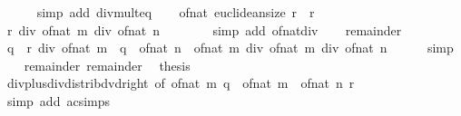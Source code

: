 \begin{isabellebody}
\ \ \ \ \isamarkupfalse%
\ {\isacharparenleft}{\kern0pt}simp\ add{\isacharcolon}{\kern0pt}\ div{\isacharunderscore}{\kern0pt}mult{}{\isacharunderscore}{\kern0pt}eq{\isacharparenright}{\kern0pt}\isanewline
\ \ \isamarkupfalse%
\ {\isacartoucheopen}of{\isacharunderscore}{\kern0pt}nat\ {\isacharparenleft}{\kern0pt}euclidean{\isacharunderscore}{\kern0pt}size\ r{\isacharparenright}{\kern0pt}\ {\isacharequal}{\kern0pt}\ r{\isacartoucheclose}\ \isamarkupfalse%
\ {\isachardoublequoteopen}r\ div\ of{\isacharunderscore}{\kern0pt}nat\ m\ div\ of{\isacharunderscore}{\kern0pt}nat\ n\ {\isacharequal}{\kern0pt}\ {}{\isachardoublequoteclose}\isanewline
\ \ \ \ \isamarkupfalse%
\ {\isacharparenleft}{\kern0pt}simp\ add{\isacharcolon}{\kern0pt}\ of{\isacharunderscore}{\kern0pt}nat{\isacharunderscore}{\kern0pt}div{\isacharparenright}{\kern0pt}\isanewline
\ \ \isamarkupfalse%
\ remainder{\isacharparenleft}{\kern0pt}{}{\isacharparenright}{\kern0pt}\isanewline
\ \ \isamarkupfalse%
\ {\isachardoublequoteopen}q\ {\isacharequal}{\kern0pt}\ {\isacharparenleft}{\kern0pt}r\ div\ of{\isacharunderscore}{\kern0pt}nat\ m\ {\isacharplus}{\kern0pt}\ q\ {\isacharasterisk}{\kern0pt}\ of{\isacharunderscore}{\kern0pt}nat\ n\ {\isacharasterisk}{\kern0pt}\ of{\isacharunderscore}{\kern0pt}nat\ m\ div\ of{\isacharunderscore}{\kern0pt}nat\ m{\isacharparenright}{\kern0pt}\ div\ of{\isacharunderscore}{\kern0pt}nat\ n{\isachardoublequoteclose}\isanewline
\ \ \ \ \isamarkupfalse%
\ simp\isanewline
\ \ \isamarkupfalse%
\ remainder{\isacharparenleft}{\kern0pt}{}{\isacharparenright}{\kern0pt}\ remainder{\isacharparenleft}{\kern0pt}{}{\isacharparenright}{\kern0pt}\ \isamarkupfalse%
\ {\isacharquery}{\kern0pt}thesis\isanewline
\ \ \ \ \isamarkupfalse%
\ div{\isacharunderscore}{\kern0pt}plus{\isacharunderscore}{\kern0pt}div{\isacharunderscore}{\kern0pt}distrib{\isacharunderscore}{\kern0pt}dvd{\isacharunderscore}{\kern0pt}right\ {\isacharbrackleft}{\kern0pt}of\ {\isachardoublequoteopen}of{\isacharunderscore}{\kern0pt}nat\ m{\isachardoublequoteclose}\ {\isachardoublequoteopen}q\ {\isacharasterisk}{\kern0pt}\ {\isacharparenleft}{\kern0pt}of{\isacharunderscore}{\kern0pt}nat\ m\ {\isacharasterisk}{\kern0pt}\ of{\isacharunderscore}{\kern0pt}nat\ n{\isacharparenright}{\kern0pt}{\isachardoublequoteclose}\ r{\isacharbrackright}{\kern0pt}\isanewline
\ \ \ \ \isamarkupfalse%
\ {\isacharparenleft}{\kern0pt}simp\ add{\isacharcolon}{\kern0pt}\ ac{\isacharunderscore}{\kern0pt}simps{\isacharparenright}{\kern0pt}\isanewline

\end{isabellebody}
